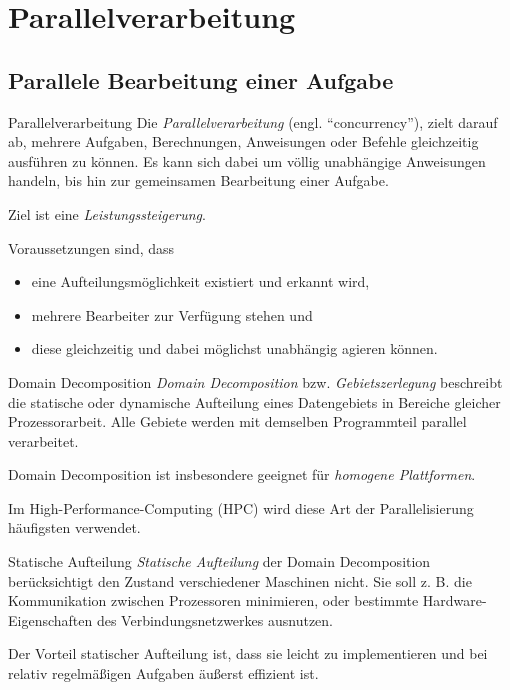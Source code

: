 \section{Parallelverarbeitung}\label{sec:parallelverarbeitung}

\subsection{Parallele Bearbeitung einer Aufgabe}

\begin{defi}{Parallelverarbeitung}
    Die \emph{Parallelverarbeitung} (engl. \enquote{concurrency}), zielt darauf ab, mehrere Aufgaben, Berechnungen, Anweisungen oder Befehle gleichzeitig ausführen zu können.
    Es kann sich dabei um völlig unabhängige Anweisungen handeln, bis hin zur gemeinsamen Bearbeitung einer Aufgabe.

    Ziel ist eine \emph{Leistungssteigerung}.

    Voraussetzungen sind, dass
    \begin{itemize}
        \item eine Aufteilungsmöglichkeit existiert und erkannt wird,
        \item mehrere Bearbeiter zur Verfügung stehen und
        \item diese gleichzeitig und dabei möglichst unabhängig agieren können.
    \end{itemize}
\end{defi}

\begin{defi}{Domain Decomposition}
    \emph{Domain Decomposition} bzw. \emph{Gebietszerlegung} beschreibt die statische oder dynamische Aufteilung eines Datengebiets in Bereiche gleicher Prozessorarbeit.
    Alle Gebiete werden mit demselben Programmteil parallel verarbeitet.

    Domain Decomposition ist insbesondere geeignet für \emph{homogene Plattformen}.

    Im High-Performance-Computing (HPC) wird diese Art der Parallelisierung häufigsten verwendet.
\end{defi}

\begin{defi}{Statische Aufteilung}
    \emph{Statische Aufteilung} der Domain Decomposition berücksichtigt den Zustand verschiedener Maschinen nicht.
    Sie soll z. B. die Kommunikation zwischen Prozessoren minimieren, oder bestimmte Hardware-Eigenschaften des Verbindungsnetzwerkes ausnutzen.

    Der Vorteil statischer Aufteilung ist, dass sie leicht zu implementieren und bei relativ regelmäßigen Aufgaben äußerst effizient ist.
\end{defi}

